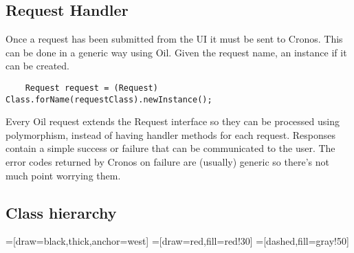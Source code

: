 \documentclass[a4paper, 11pt, titlepage]{article}
\begin{document}
	\subsection{Request Handler}
	Once a request has been submitted from the UI it must be sent to Cronos. This can be done in a generic way using Oil. Given the request name, an instance if it can be created.
	\begin{verbatim}
	Request request = (Request) Class.forName(requestClass).newInstance();
	\end{verbatim}
	Every Oil request extends the Request interface so they can be processed using polymorphism, instead of having handler methods for each request. Responses contain a simple success or failure that can be communicated to the user. The error codes returned by Cronos on failure are (usually) generic so there's not much point worrying them.

\subsection{Class hierarchy}

=[draw=black,thick,anchor=west]
=[draw=red,fill=red!30]
=[dashed,fill=gray!50]


 
\end{document}

